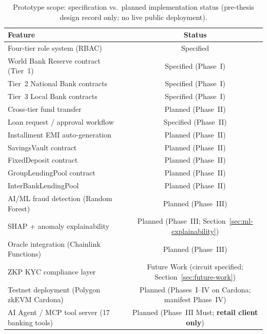 \documentclass[12pt,a4paper]{report}
\newcommand{\tmarkPartial}{\faHourglassHalf}
\newcommand{\tmarkPlanned}{\textcolor{black!55}{\faCircle}}
\newcommand{\tableheadcolor}{\rowcolor{TableHeadBg}}
\newcommand{\tableheadfont}{\bfseries}
\begin{document}
\begin{table}[H]
\centering
\caption[Prototype scope and implementation status]{Prototype scope: specification vs.\ planned implementation status (pre-thesis design record only; no live public deployment).}
\label{tab:prototype-scope}
\begin{tabular}{@{}p{7.5cm}c@{}}
\toprule
\tableheadcolor
\tableheadfont Feature & \tableheadfont Status \\
\midrule
Four-tier role system (RBAC) & \tmarkPartial{} Specified \\
\rowcolor{RowShade}
World Bank Reserve contract (Tier~1) & \tmarkPartial{} Specified (Phase~I) \\
Tier~2 National Bank contracts & \tmarkPartial{} Specified (Phase~I) \\
\rowcolor{RowShade}
Tier~3 Local Bank contracts & \tmarkPartial{} Specified (Phase~I) \\
Cross-tier fund transfer & \tmarkPlanned{} Planned (Phase~II) \\
\rowcolor{RowShade}
Loan request / approval workflow & \tmarkPartial{} Specified (Phase~II) \\
Installment EMI auto-generation & \tmarkPlanned{} Planned (Phase~II) \\
\rowcolor{RowShade}
SavingsVault contract & \tmarkPlanned{} Planned (Phase~II) \\
FixedDeposit contract & \tmarkPlanned{} Planned (Phase~II) \\
\rowcolor{RowShade}
GroupLendingPool contract & \tmarkPlanned{} Planned (Phase~II) \\
InterBankLendingPool & \tmarkPlanned{} Planned (Phase~II) \\
\rowcolor{RowShade}
AI/ML fraud detection (Random Forest) & \tmarkPlanned{} Planned (Phase~III) \\
SHAP + anomaly explainability & \tmarkPlanned{} Planned (Phase~III; Section~\ref{sec:ml-explainability}) \\
\rowcolor{RowShade}
Oracle integration (Chainlink Functions) & \tmarkPlanned{} Planned (Phase~III) \\
ZKP KYC compliance layer & \tmarkPlanned{} Future Work (circuit specified; Section~\ref{sec:future-work}) \\
\rowcolor{RowShade}
Testnet deployment (Polygon zkEVM Cardona) & \tmarkPlanned{} Planned (Phases~I--IV on Cardona; manifest Phase~IV) \\
AI Agent / MCP tool server (17 banking tools) & \tmarkPlanned{} Planned (Phase~III Must; \textbf{retail client only}) \\

\end{tabular}
\end{table}
\end{document}
